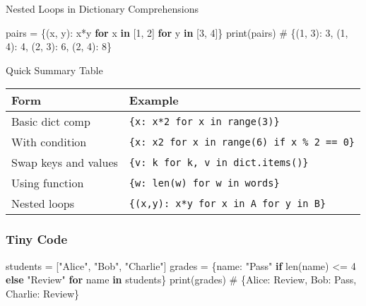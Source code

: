 \documentclass[
  letterpaper,
  DIV=11,
  numbers=noendperiod]{scrreprt}
\newenvironment{Shaded}{\begin{snugshade}}{\end{snugshade}}
\newcommand{\BuiltInTok}[1]{\textcolor[rgb]{0.00,0.23,0.31}{#1}}
\newcommand{\CommentTok}[1]{\textcolor[rgb]{0.37,0.37,0.37}{#1}}
\newcommand{\ControlFlowTok}[1]{\textcolor[rgb]{0.00,0.23,0.31}{\textbf{#1}}}
\newcommand{\DecValTok}[1]{\textcolor[rgb]{0.68,0.00,0.00}{#1}}
\newcommand{\KeywordTok}[1]{\textcolor[rgb]{0.00,0.23,0.31}{\textbf{#1}}}
\newcommand{\NormalTok}[1]{\textcolor[rgb]{0.00,0.23,0.31}{#1}}
\newcommand{\OperatorTok}[1]{\textcolor[rgb]{0.37,0.37,0.37}{#1}}
\newcommand{\StringTok}[1]{\textcolor[rgb]{0.13,0.47,0.30}{#1}}
\begin{document}
Nested Loops in Dictionary Comprehensions

\begin{Shaded}
\begin{Highlighting}[]
\NormalTok{pairs }\OperatorTok{=}\NormalTok{ \{(x, y): x}\OperatorTok{*}\NormalTok{y }\ControlFlowTok{for}\NormalTok{ x }\KeywordTok{in}\NormalTok{ [}\DecValTok{1}\NormalTok{, }\DecValTok{2}\NormalTok{] }\ControlFlowTok{for}\NormalTok{ y }\KeywordTok{in}\NormalTok{ [}\DecValTok{3}\NormalTok{, }\DecValTok{4}\NormalTok{]\}}
\BuiltInTok{print}\NormalTok{(pairs)   }\CommentTok{\# \{(1, 3): 3, (1, 4): 4, (2, 3): 6, (2, 4): 8\}}
\end{Highlighting}
\end{Shaded}

Quick Summary Table

\begin{longtable}[]{@{}ll@{}}
\toprule\noalign{}
Form & Example \\
\midrule\noalign{}
\endhead
\bottomrule\noalign{}
\endlastfoot
Basic dict comp & \texttt{\{x:\ x*2\ for\ x\ in\ range(3)\}} \\
With condition &
\texttt{\{x:\ x2\ for\ x\ in\ range(6)\ if\ x\ \%\ 2\ ==\ 0\}} \\
Swap keys and values &
\texttt{\{v:\ k\ for\ k,\ v\ in\ dict.items()\}} \\
Using function & \texttt{\{w:\ len(w)\ for\ w\ in\ words\}} \\
Nested loops & \texttt{\{(x,y):\ x*y\ for\ x\ in\ A\ for\ y\ in\ B\}} \\
\end{longtable}

\subsubsection{Tiny Code}\label{tiny-code-81}

\begin{Shaded}
\begin{Highlighting}[]
\NormalTok{students }\OperatorTok{=}\NormalTok{ [}\StringTok{"Alice"}\NormalTok{, }\StringTok{"Bob"}\NormalTok{, }\StringTok{"Charlie"}\NormalTok{]}
\NormalTok{grades }\OperatorTok{=}\NormalTok{ \{name: }\StringTok{"Pass"} \ControlFlowTok{if} \BuiltInTok{len}\NormalTok{(name) }\OperatorTok{\textless{}=} \DecValTok{4} \ControlFlowTok{else} \StringTok{"Review"} \ControlFlowTok{for}\NormalTok{ name }\KeywordTok{in}\NormalTok{ students\}}
\BuiltInTok{print}\NormalTok{(grades)   }\CommentTok{\# \{\textquotesingle{}Alice\textquotesingle{}: \textquotesingle{}Review\textquotesingle{}, \textquotesingle{}Bob\textquotesingle{}: \textquotesingle{}Pass\textquotesingle{}, \textquotesingle{}Charlie\textquotesingle{}: \textquotesingle{}Review\textquotesingle{}\}}
\end{Highlighting}
\end{Shaded}
\end{document}
